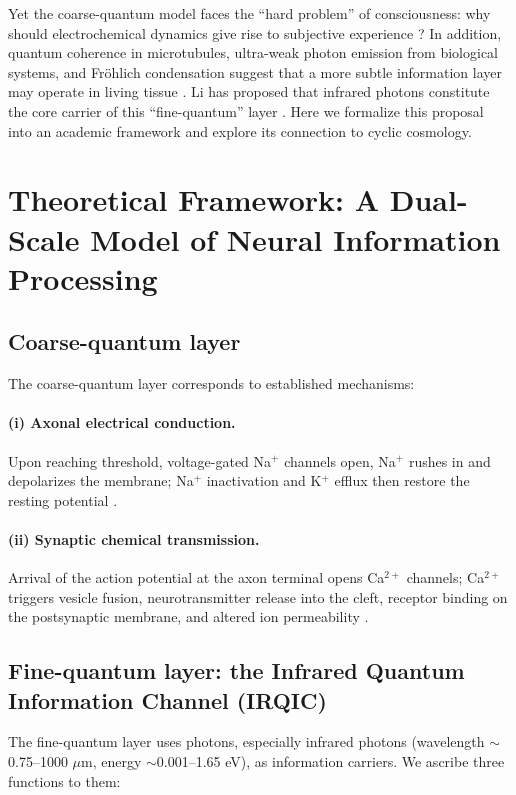 \documentclass[11pt,a4paper]{article}
\begin{document}
Yet the coarse-quantum model faces the ``hard problem'' of consciousness: why should electrochemical dynamics give rise to subjective experience \cite{Chalmers1995}? In addition, quantum coherence in microtubules, ultra-weak photon emission from biological systems, and Fr\"{o}hlich condensation suggest that a more subtle information layer may operate in living tissue \cite{Hameroff2014,Craddock2018,Popp1992,Frohlich1968}. Li has proposed that infrared photons constitute the core carrier of this ``fine-quantum'' layer \cite{Li2026a}. Here we formalize this proposal into an academic framework and explore its connection to cyclic cosmology.

\section{Theoretical Framework: A Dual-Scale Model of Neural Information Processing}

\subsection{Coarse-quantum layer}

The coarse-quantum layer corresponds to established mechanisms:

\paragraph{(i) Axonal electrical conduction.} Upon reaching threshold, voltage-gated Na$^+$ channels open, Na$^+$ rushes in and depolarizes the membrane; Na$^+$ inactivation and K$^+$ efflux then restore the resting potential \cite{Hodgkin1952,Waxman1980}.

\paragraph{(ii) Synaptic chemical transmission.} Arrival of the action potential at the axon terminal opens Ca$^{2+}$ channels; Ca$^{2+}$ triggers vesicle fusion, neurotransmitter release into the cleft, receptor binding on the postsynaptic membrane, and altered ion permeability \cite{Katz1969}.

\subsection{Fine-quantum layer: the Infrared Quantum Information Channel (IRQIC)}

The fine-quantum layer uses photons, especially infrared photons (wavelength $\sim$0.75--1000 $\mu$m, energy $\sim$0.001--1.65 eV), as information carriers. We ascribe three functions to them:
\end{document}
